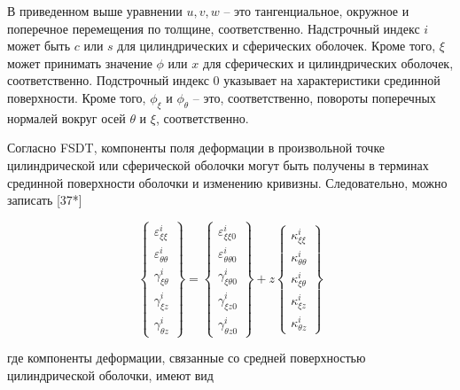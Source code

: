 В приведенном выше уравнении \(u, v, w\) -- это тангенциальное, окружное и поперечное перемещения по толщине, соответственно. Надстрочный индекс \(i\) может быть \(c\) или \(s\) для цилиндрических и сферических оболочек. Кроме того, \(\xi\) может принимать значение \(\phi\) или \(x\) для сферических и цилиндрических оболочек, соответственно. Подстрочный индекс 0 указывает на характеристики срединной поверхности. Кроме того, \(\phi_{\xi}\) и \(\phi_{\theta}\)  -- это, соответственно, повороты поперечных нормалей вокруг осей \(\theta\) и \(\xi\), соответственно.

Согласно FSDT, компоненты поля деформации в произвольной точке цилиндрической или сферической оболочки могут быть получены в терминах срединной поверхности оболочки и изменению кривизны.  Следовательно, можно записать [37*]

\begin{equation}
	\label{eq:vibro1:4}
	\begin{Bmatrix}
		\varepsilon_{\xi \xi}^i \\
		\varepsilon_{\theta \theta}^i \\
		\gamma_{\xi \theta}^i \\
		\gamma_{\xi z}^i \\
		\gamma_{\theta z}^i
	\end{Bmatrix} =
	\begin{Bmatrix}
		\varepsilon_{\xi \xi 0}^i \\
		\varepsilon_{\theta \theta 0}^i \\
		\gamma_{\xi \theta 0}^i \\
		\gamma_{\xi z 0}^i \\
		\gamma_{\theta z 0}^i
	\end{Bmatrix}
	+ z
		\begin{Bmatrix}
			\kappa_{\xi \xi}^i \\
			\kappa_{\theta \theta}^i \\
			\kappa_{\xi \theta}^i \\
			\kappa_{\xi z}^i \\
			\kappa_{\theta z}^i
	\end{Bmatrix}
\end{equation}

где компоненты деформации, связанные со средней поверхностью цилиндрической оболочки, имеют вид

